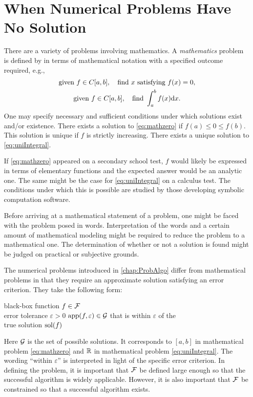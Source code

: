 \chapter{When Numerical Problems Have No Solution} \label{chap:NoSolution}

There are a variety of problems involving mathematics.  A \emph{mathematics} problem is defined by in terms of mathematical notation with a specified outcome required, e.g., 
\begin{gather}\label{eq:mathzero}
    \text{given } f \in C[a,b],  \quad \text{find } x \text{ satisfying } f(x) = 0, \\
    \label{eq:uniIntegral}
    \text{given } f \in C[a,b],  \quad \text{find } \int_a^b f(x) {\rm d} x.
\end{gather} 
One may specify necessary and sufficient conditions under which solutions exist and/or existence.  There exists a solution to \eqref{eq:mathzero} if $f(a) \le 0 \le f(b)$.  This solution is unique if $f$ is strictly increasing.  There exists a unique solution to \eqref{eq:uniIntegral}.

If \eqref{eq:mathzero} appeared on a secondary school test, $f$ would likely be expressed in terms of elementary functions and the expected answer would be an analytic one.  The same might be the case for \eqref{eq:uniIntegral} on a calculus test.  The conditions under which this is possible are studied by those developing symbolic computation software.  

Before arriving at a mathematical statement of a problem, one might be faced with the problem posed in words.  Interpretation of the words and a certain amount of mathematical modeling might be required to reduce the problem to a mathematical one.  The determination of whether or not a solution is found might be judged on practical or subjective grounds.

The numerical problems introduced in \cref{chap:ProbAlgo} differ from mathematical problems in that they require an approximate solution satisfying an error criterion.  They take the following form:
\begin{NumProblem}
\label{prob:generalProblem}
{black-box function $f \in \mathcal{F}$ \\ error tolerance $\varepsilon > 0$}
{$\operatorname{app}(f,\varepsilon) \in \mathcal{G}$ that is within $\varepsilon$ of the \\ \qquad true solution $\operatorname{sol}(f)$}
\end{NumProblem}
Here $\mathcal{G}$ is the set of possible solutions.  It corresponds to $[a,b]$ in mathematical problem \eqref{eq:mathzero} and $\mathbb{R}$ in mathematical problem \eqref{eq:uniIntegral}.  The wording ``within $\varepsilon$'' is interpreted in light of the specific error criterion.
In defining the problem, it is important that $\mathcal{F}$ be defined large enough so that the successful algorithm is widely applicable.  However, it is also important that $\mathcal{F}$ be constrained so that a successful algorithm exists.  

